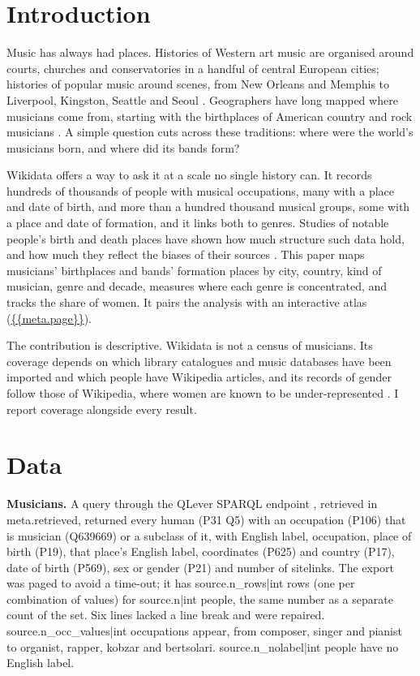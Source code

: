 \documentclass[11pt,a4paper]{article}
\begin{document}
\section{Introduction}
Music has always had places. Histories of Western art music are organised around courts, churches and conservatories in a handful of central European cities; histories of popular music around scenes, from New Orleans and Memphis to Liverpool, Kingston, Seattle and Seoul \citep{connell, bennett}. Geographers have long mapped where musicians come from, starting with the birthplaces of American country and rock musicians \citep{carney}. A simple question cuts across these traditions: where were the world's musicians born, and where did its bands form?

Wikidata \citep{wikidata} offers a way to ask it at a scale no single history can. It records hundreds of thousands of people with musical occupations, many with a place and date of birth, and more than a hundred thousand musical groups, some with a place and date of formation, and it links both to genres. Studies of notable people's birth and death places have shown how much structure such data hold, and how much they reflect the biases of their sources \citep{schich}. This paper maps musicians' birthplaces and bands' formation places by city, country, kind of musician, genre and decade, measures where each genre is concentrated, and tracks the share of women. It pairs the analysis with an interactive atlas (\url{{{meta.page}}}).

The contribution is descriptive. Wikidata is not a census of musicians. Its coverage depends on which library catalogues and music databases have been imported and which people have Wikipedia articles, and its records of gender follow those of Wikipedia, where women are known to be under-represented \citep{wagner}. I report coverage alongside every result.

\section{Data}
\textbf{Musicians.} A query through the QLever SPARQL endpoint \citep{qlever}, retrieved in {{meta.retrieved}}, returned every human (P31 Q5) with an occupation (P106) that is musician (Q639669) or a subclass of it, with English label, occupation, place of birth (P19), that place's English label, coordinates (P625) and country (P17), date of birth (P569), sex or gender (P21) and number of sitelinks. The export was paged to avoid a time-out; it has {{source.n_rows|int}} rows (one per combination of values) for {{source.n|int}} people, the same number as a separate count of the set. Six lines lacked a line break and were repaired. {{source.n_occ_values|int}} occupations appear, from composer, singer and pianist to organist, rapper, kobzar and bertsolari. {{source.n_nolabel|int}} people have no English label.
\end{document}
